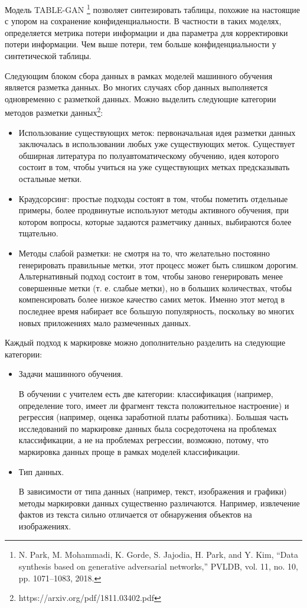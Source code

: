 \documentclass[12pt,a4paper, oneside]{extreport}
\begin{document}
 
Модель TABLE-GAN \footnote{N. Park, M. Mohammadi, K. Gorde, S. Jajodia, H. Park, and 	Y. Kim, “Data synthesis based on generative adversarial networks,” PVLDB, vol. 11, no. 10, pp. 1071–1083, 2018.} позволяет  синтезировать  таблицы, похожие на настоящие  с упором на сохранение конфиденциальности. В частности в таких моделях, определяется  метрика потери информации и два параметра для корректировки потери информации. Чем выше потери, тем больше конфиденциальности у синтетической таблицы.


Следующим блоком сбора данных в рамках моделей машинного обучения является разметка данных. 
Во многих случаях сбор данных выполняется одновременно с разметкой  данных. Можно выделить следующие категории методов разметки данных\footnote{https://arxiv.org/pdf/1811.03402.pdf}:

\begin{itemize}
	\item  Использование существующих меток: первоначальная идея разметки данных заключалась в использовании любых уже существующих меток. Существует обширная литература по полуавтоматическому обучению, идея которого  состоит в том, чтобы учиться на уже существующих  метках предсказывать остальные метки. 
	\item  Краудсорсинг: простые  подходы состоят в том, чтобы пометить отдельные примеры, более продвинутые используют методы активного обучения, при котором вопросы, которые  задаются разметчику данных, выбираются более тщательно. 
	\item  Методы слабой разметки: не смотря на то, что желательно постоянно генерировать правильные метки, этот процесс может быть слишком дорогим. Альтернативный подход состоит в том, чтобы заново генерировать менее совершенные метки (т. е. слабые метки), но в больших количествах, чтобы компенсировать более низкое качество самих меток. Именно этот метод в последнее время набирает все большую популярность, поскольку во многих новых приложениях мало размеченных данных.
\end{itemize} 

Каждый подход к маркировке можно дополнительно разделить на следующие категории: 

\begin{itemize}
	\item  Задачи машинного обучения. 
	
	В  обучении с учителем есть две категории:   классификация (например, определение того, имеет ли фрагмент текста положительное настроение) и регрессия (например, оценка заработной платы работника). Большая часть исследований по маркировке данных была сосредоточена на проблемах классификации, а не на проблемах регрессии, возможно, потому, что маркировка данных проще в рамках моделей классификации. 
	
	\item  Тип данных. 
	
	В зависимости от типа данных (например, текст, изображения и графики) методы маркировки данных существенно различаются. Например, извлечение фактов из текста сильно отличается от обнаружения объектов на изображениях. 
\end{itemize}
\end{document}

